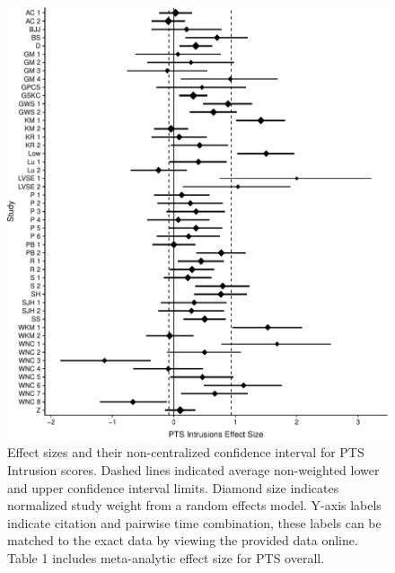 \documentclass[,man]{apa6}
\begin{document}
\begin{figure}
\centering
\includegraphics{meta_markdown_files/figure-latex/ptspicint-1.pdf}
\caption{\label{fig:ptspicint}Effect sizes and their non-centralized confidence interval for PTS Intrusion scores. Dashed lines indicated average non-weighted lower and upper confidence interval limits. Diamond size indicates normalized study weight from a random effects model. Y-axis labels indicate citation and pairwise time combination, these labels can be matched to the exact data by viewing the provided data online. Table 1 includes meta-analytic effect size for PTS overall.}
\end{figure}
\end{document}
